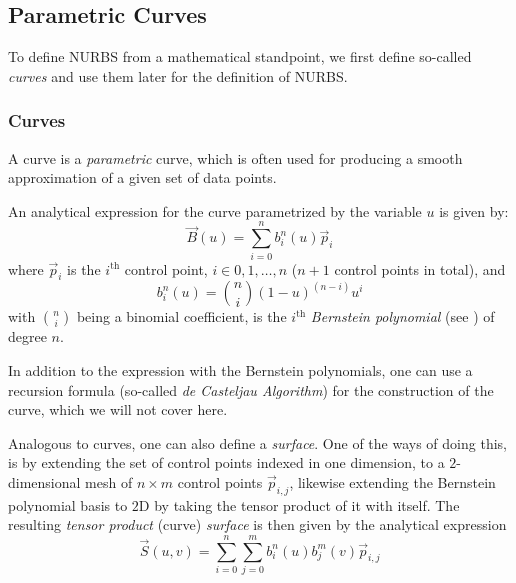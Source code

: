 \subsection{Parametric Curves}
\label{subsec:paracurves}

To define NURBS from a mathematical standpoint, we first define so-called \emph{\Bez curves} and use them later for the definition of NURBS. 
\subsubsection{\Bez Curves}
A \Bez curve is a \textit{parametric} curve, which is often used for producing a smooth approximation of a given set of data points.
 
An analytical expression for the \Bez curve parametrized by the variable $u$ is given by:
\begin{equation*}
\vec{B}(u)=\sum\limits_{i=0}^n b_i^n(u) \vec{p}_i
\end{equation*}
where $\vec{p}_i$ is the $i^{\text{th}}$ control point, $i\in0,1, \dots ,n$ ($n+1$ control points in total), and
\begin{equation*}
b_i^n(u)=\binom{n}{i}(1-u)^{(n-i)}u^i
\end{equation*}
with $\binom{n}{i}$ being a binomial coefficient, is the $i^{\text{th}}$ \emph{Bernstein polynomial} (see \cite{lorentz2012bernstein}) of degree $n$.

In addition to the expression with the Bernstein polynomials, one can use a recursion formula (so-called \emph{de Casteljau Algorithm}) for the construction of the \Bez curve, which we will not cover here. 

Analogous to \Bez curves, one can also define a \textit{\Bez surface}. One of the ways of doing this, is by extending the set of control points indexed in one dimension, to a $2$-dimensional mesh of $n\times m$ control points $\vec{p}_{i,j}$, likewise extending the Bernstein polynomial basis to $2$D by taking the tensor product of it with itself. The resulting \textit{tensor product \Bez} (curve) \textit{surface} is then given by the analytical expression
\begin{equation}
\label{eq:bezsurface}
\vec{S}(u,v)=\sum\limits_{i=0}^n \sum\limits_{j=0}^m b_i^n(u) b_j^m(v) \vec{p}_{i,j}
\end{equation}

